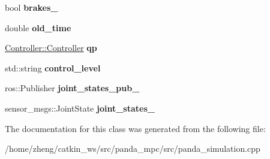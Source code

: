 \begin{DoxyCompactItemize}
\mbox{\label{classgazebo_1_1_panda_simulation_ac78dfbd642bdd959ae98ea0b4b7009e6}} 
bool {\bfseries brakes\+\_\+}
\item 
\mbox{\label{classgazebo_1_1_panda_simulation_a7969b2892ab06a98984c069b3724fa3e}} 
double {\bfseries old\+\_\+time}
\item 
\mbox{\label{classgazebo_1_1_panda_simulation_aa09a367c75567516386b5aabe77aa8e8}} 
\hyperlink{class_controller_1_1_controller}{Controller\+::\+Controller} {\bfseries qp}
\item 
\mbox{\label{classgazebo_1_1_panda_simulation_ab0c67a1a87c61b8edc035cdc1c57d922}} 
std\+::string {\bfseries control\+\_\+level}
\item 
\mbox{\label{classgazebo_1_1_panda_simulation_a1628fdf512b4f9984e138268f27be602}} 
ros\+::\+Publisher {\bfseries joint\+\_\+states\+\_\+pub\+\_\+}
\item 
\mbox{\label{classgazebo_1_1_panda_simulation_a9c8b4023a0f65f89aeab2ab97ee761fb}} 
sensor\+\_\+msgs\+::\+Joint\+State {\bfseries joint\+\_\+states\+\_\+}
\end{DoxyCompactItemize}


The documentation for this class was generated from the following file\+:\begin{DoxyCompactItemize}
\item 
/home/zheng/catkin\+\_\+ws/src/panda\+\_\+mpc/src/panda\+\_\+simulation.\+cpp\end{DoxyCompactItemize}
